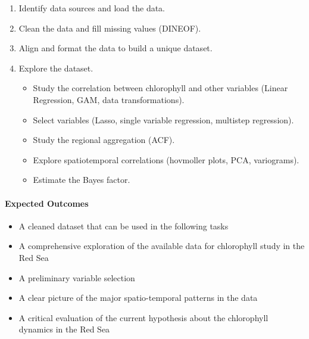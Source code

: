 \begin{enumerate}
  \item Identify data sources and load the data.
  \item Clean the data and fill missing values (DINEOF).
  \item Align and format the data to build a unique dataset.
  \item Explore the dataset.
  \begin{itemize}
    \item Study the correlation between chlorophyll and other variables (Linear Regression, GAM, data transformations).
    \item Select variables (Lasso, single variable regression, multistep regression).
    \item Study the regional aggregation (ACF).
    \item Explore spatiotemporal correlations (hovmoller plots, PCA, variograms).
    \item Estimate the Bayes factor.
  \end{itemize}
\end{enumerate}

\paragraph{Expected Outcomes}

\begin{itemize}
  \item A cleaned dataset that can be used in the following tasks
  \item A comprehensive exploration of the available data for chlorophyll study in the Red Sea
  \item A preliminary variable selection
  \item A clear picture of the major spatio-temporal patterns in the data
  \item A critical evaluation of the current hypothesis about the chlorophyll dynamics in the Red Sea
\end{itemize}
